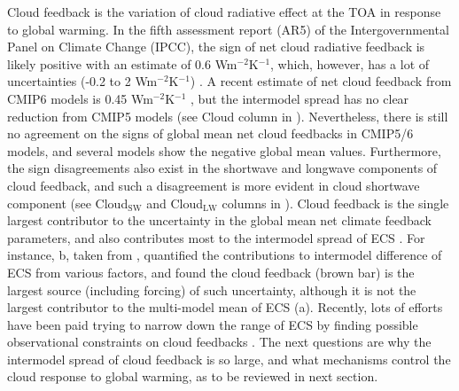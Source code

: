 Cloud feedback is the variation of cloud radiative effect at the TOA in response to global warming. In the fifth assessment report (AR5) of the Intergovernmental Panel on Climate Change (IPCC), the sign of net cloud radiative feedback is likely positive with an estimate of 0.6 Wm$^{-2}$K$^{-1}$, which, however, has a lot of uncertainties (-0.2 to 2 Wm$^{-2}$K$^{-1}$) \citep{Stocker2013}. A recent estimate of net cloud feedback from CMIP6 models is 0.45 Wm$^{-2}$K$^{-1}$ \citep{Zelinka2020causes,Sherwood2020}, but the intermodel spread has no clear reduction from CMIP5 models (see Cloud column in ). Nevertheless, there is still no agreement on the signs of global mean net cloud feedbacks in CMIP5/6 models, and several models show the negative global mean values. Furthermore, the sign disagreements also exist in the shortwave and longwave components of cloud feedback, and such a disagreement is more evident in cloud shortwave component (see Cloud$_{\mathrm{SW}}$ and Cloud$_{\mathrm{LW}}$ columns in ). Cloud feedback is the single largest contributor to the uncertainty in the global mean net climate feedback parameters, and also contributes most to the intermodel spread of ECS \citep{Bony2005,Soden2006,Dufresne2008assessment,Colman2011tropospheric,Vial2013,Ceppi2017,Zelinka2020causes,Sherwood2020}. For instance, b, taken from \cite{Dufresne2008assessment}, quantified the contributions to intermodel difference of ECS from various factors, and found the cloud feedback (brown bar) is the largest source (including forcing) of such uncertainty, although it is not the largest contributor to the multi-model mean of ECS (a). Recently, lots of efforts have been paid trying to narrow down the range of ECS by finding possible observational constraints on cloud feedbacks \citep[e.g.,][]{Cesana2021,Myers2021}. The next questions are why the intermodel spread of cloud feedback is so large, and what mechanisms control the cloud response to global warming, as to be reviewed in next section. 



